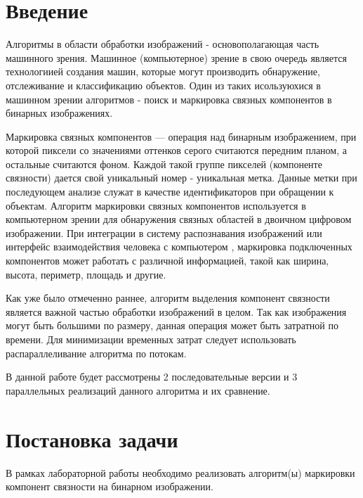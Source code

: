 \documentclass{report}
\begin{document}
	\setcounter{page}{2}

\newpage
\tableofcontents

\newpage
\section*{Введение}
\par Алгоритмы в области обработки изображений - основополагающая часть машинного зрения. Машинное (компьютерное) зрение в свою очередь является технологиией создания машин, которые могут производить обнаружение, отслеживание и классификацию объектов. Один из таких исользуюхися в машинном зрении алгоритмов -  поиск и маркировка связных компонентов в бинарных изображениях.

\par Маркировка связных компонентов — операция над бинарным изображением, при которой пиксели со значениями оттенков серого считаются передним планом, а остальные считаются фоном. Каждой такой группе пикселей (компоненте связности) дается свой уникальный номер - уникальная метка. Данные метки при последующем анализе служат в качестве идентификаторов при обращении к объектам. Алгоритм маркировки связных компонентов используется в компьютерном зрении для обнаружения связных областей в двоичном цифровом изображении. При интеграции в систему распознавания изображений или интерфейс взаимодействия человека с компьютером , маркировка подключенных компонентов может работать с различной информацией, такой как ширина, высота, периметр, площадь и другие. 

\par Как уже было отмеченно раннее, алгоритм выделения компонент связности является важной частью обработки изображений в целом. Так как изображения могут быть большими по размеру, данная операция может быть затратной по времени. Для минимизации временных затрат следует использовать распараллеливание алгоритма по потокам.

\par В данной работе будет рассмотрены 2 последовательные версии и 3 параллельных реализаций данного алгоритма и их сравнение.

\newpage
\section*{Постановка задачи}

В рамках лабораторной работы необходимо реализовать алгоритм(ы) маркировки компонент связности на бинарном изображении.
\end{document}
